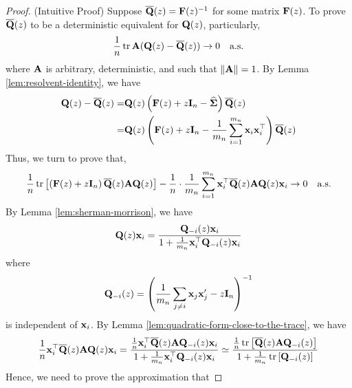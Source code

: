 \begin{proof}
	(Intuitive Proof) Suppose $\overline{{\bf Q}}(z)={\bf F}(z)^{-1}$ for some matrix ${\bf F}(z)$. To prove $\overline{{\bf Q}}(z)$ to be a deterministic equivalent for ${\bf Q}(z)$, particularly,
	\begin{equation*}
		\frac{1}{n}\operatorname{tr}{\bf A}({\bf Q}(z)-\overline{{\bf Q}}(z))\rightarrow 0\quad\text{a.s.}
	\end{equation*}
	where ${\bf A}$ is arbitrary, deterministic, and such that $\|{\bf A}\|=1$. By Lemma \ref{lem:resolvent-identity}, we have
	\begin{equation*}
		\begin{aligned}
			{\bf Q}(z)-\overline{{\bf Q}}(z)= & {\bf Q}(z)\left({\bf F}(z)+z\mathbf{I}_{n}-\widehat{\boldsymbol{\Sigma}}\right) \overline{{\bf Q}}(z)                                      \\
			=                           & {\bf Q}(z)\left({\bf F}(z)+z\mathbf{I}_{n}-\frac{1}{m_{n}}\sum_{i=1}^{m_{n}}{\bf x}_{i}{\bf x}_{i}^{\top}\right)\overline{{\bf Q}}(z)
		\end{aligned}
	\end{equation*}
	Thus, we turn to prove that,
	\begin{equation*}
		\frac{1}{n}\operatorname{tr}\left[\left({\bf F}(z)+z\mathbf{I}_{n}\right)\overline{{\bf Q}}(z){\bf A}{\bf Q}(z)\right]-\frac{1}{n}\cdot\frac{1}{m_{n}}\sum_{i=1}^{m_{n}}{\bf x}_{i}^{\top}\overline{{\bf Q}}(z){\bf A}{\bf Q}(z){\bf x}_{i}\rightarrow 0\quad\text{a.s.}
	\end{equation*}
	By Lemma \ref{lem:sherman-morrison}, we have
	\begin{equation*}
		{\bf Q}(z){\bf x}_{i}=\frac{{\bf Q}_{-i}(z){\bf x}_{i}}{1+\frac{1}{m_{n}}{\bf x}_{i}^{\top}{\bf Q}_{-i}(z){\bf x}_{i}}
	\end{equation*}
	where
	\begin{equation*}
		{\bf Q}_{-i}(z)=\left(\frac{1}{m_{n}}\sum_{j\neq i}{\bf x}_{j}{\bf x}_{j}^{\prime}-z\mathbf{I}_{n}\right)^{-1}
	\end{equation*}
	is independent of ${\bf x}_{i}$. By Lemma \ref{lem:quadratic-form-close-to-the-trace}, we have
	\begin{equation*}
		\frac{1}{n}{\bf x}_{i}^{\top}\overline{{\bf Q}}(z){\bf A}{\bf Q}(z){\bf x}_{i}=\frac{\frac{1}{n}{\bf x}_{i}^{\top}\overline{{\bf Q}}(z){\bf A}{\bf Q}_{-i}(z){\bf x}_{i}}{1+\frac{1}{m_{n}}{\bf x}_{i}^{\top}{\bf Q}_{-i}(z){\bf x}_{i}}\simeq\frac{\frac{1}{n}\operatorname{tr}\left[\overline{{\bf Q}}(z){\bf A}{\bf Q}_{-i}(z)\right]}{1+\frac{1}{m_{n}}\operatorname{tr}\left[{\bf Q}_{-i}(z)\right]}
	\end{equation*}
	Hence, we need to prove the approximation that

\end{proof}
